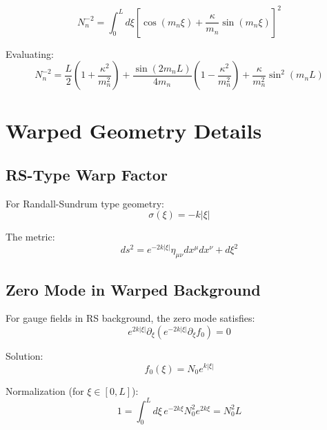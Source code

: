 \documentclass[11pt,a4paper]{article}
\begin{document}
\begin{equation}
  N_n^{-2} = \int_0^L d\xi \left[ \cos(m_n \xi) + \frac{\kappa}{m_n} \sin(m_n \xi) \right]^2
  \label{eq:normalization-integral}
\end{equation}

Evaluating:
\begin{equation}
  N_n^{-2} = \frac{L}{2} \left( 1 + \frac{\kappa^2}{m_n^2} \right)
    + \frac{\sin(2m_n L)}{4m_n} \left( 1 - \frac{\kappa^2}{m_n^2} \right)
    + \frac{\kappa}{m_n^2} \sin^2(m_n L)
  \label{eq:Nn-explicit}
\end{equation}

\section{Warped Geometry Details}
\label{app:warped}

\subsection{RS-Type Warp Factor}

For Randall-Sundrum type geometry:
\begin{equation}
  \sigma(\xi) = -k|\xi|
  \label{eq:rs-warp}
\end{equation}

The metric:
\begin{equation}
  ds^2 = e^{-2k|\xi|} \eta_{\mu\nu} dx^\mu dx^\nu + d\xi^2
  \label{eq:rs-metric}
\end{equation}

\subsection{Zero Mode in Warped Background}

For gauge fields in RS background, the zero mode satisfies:
\begin{equation}
  e^{2k|\xi|} \partial_\xi (e^{-2k|\xi|} \partial_\xi f_0) = 0
  \label{eq:warped-zero-eom}
\end{equation}

Solution:
\begin{equation}
  f_0(\xi) = N_0 e^{k|\xi|}
  \label{eq:warped-zero-mode-explicit}
\end{equation}

Normalization (for $\xi \in [0, L]$):
\begin{equation}
  1 = \int_0^L d\xi \, e^{-2k\xi} N_0^2 e^{2k\xi} = N_0^2 L
  \label{eq:warped-norm}
\end{equation}
\end{document}
